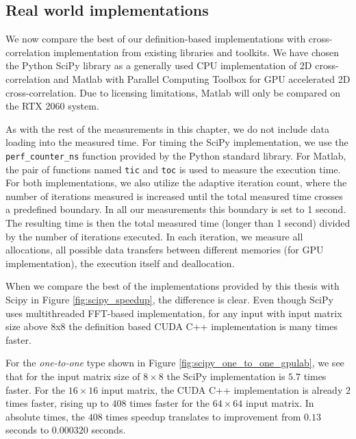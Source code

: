 \subsection{Real world implementations}

We now compare the best of our definition-based implementations with cross-correlation implementation from existing libraries and toolkits. We have chosen the Python SciPy \citet{journal:scipy} library as a generally used CPU implementation of 2D cross-correlation and Matlab \citep{site:matlab} with Parallel Computing Toolbox for GPU accelerated 2D cross-correlation. Due to licensing limitations, Matlab will only be compared on the RTX 2060 system.

As with the rest of the measurements in this chapter, we do not include data loading into the measured time. For timing the SciPy implementation, we use the \texttt{perf\_counter\_ns} function provided by the Python standard library. For Matlab, the pair of functions named \texttt{tic} and \texttt{toc} is used to measure the execution time. For both implementations, we also utilize the adaptive iteration count, where the number of iterations measured is increased until the total measured time crosses a predefined boundary. In all our measurements this boundary is set to 1 second. The resulting time is then the total measured time (longer than 1 second) divided by the number of iterations executed. In each iteration, we measure all allocations, all possible data transfers between different memories (for GPU implementation), the execution itself and deallocation.


When we compare the best of the implementations provided by this thesis with Scipy in Figure \ref{fig:scipy_speedup}, the difference is clear. Even though SciPy uses multithreaded FFT-based implementation, 
for any input with input matrix size above 8x8 the definition based CUDA C++ implementation is many times faster.

For the \textit{one-to-one} type shown in Figure \ref{fig:scipy_one_to_one_gpulab}, we see that for the input matrix size of $8 \times 8$ the SciPy implementation is $5.7$ times faster. For the $16 \times 16$ input matrix, the CUDA C++ implementation is already $2$ times faster, rising up to $408$ times faster for the $64 \times 64$ input matrix. In absolute times, the $408$ times speedup translates to improvement from $0.13$ seconds to $0.000320$ seconds.


